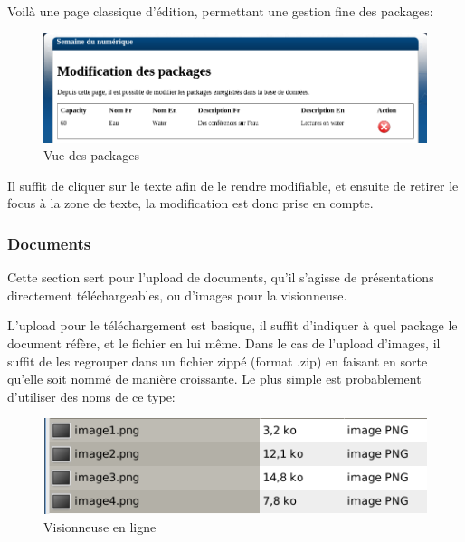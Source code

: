 Voilà une page classique d'édition, permettant une gestion fine des packages:

    \begin{figure}[h]
        \begin{center}
        \includegraphics[scale=0.4]{images/screenshotPackages.png} 
        \end{center}
        \caption{Vue des packages}
        \label{Vue des packages}
    \end{figure}

Il suffit de cliquer sur le texte afin de le rendre modifiable, et ensuite de retirer
le focus à la zone de texte, la modification est donc prise en compte.

            \subsubsection{Documents}

Cette section sert pour l'upload de documents, qu'il s'agisse de présentations directement téléchargeables, ou d'images pour la visionneuse.

L'upload pour le téléchargement est basique, il suffit d'indiquer à quel package le document réfère, et le fichier en lui même.
Dans le cas de l'upload d'images, il suffit de les regrouper dans un fichier zippé (format .zip) en faisant en sorte qu'elle soit
nommé de manière croissante. Le plus simple est probablement d'utiliser des noms de ce type:

    \begin{figure}[h]
        \begin{center}
        \includegraphics[scale=0.4]{images/screenshotImages.png} 
        \end{center}
        \caption{Visionneuse en ligne}
        \label{Visionneuse en ligne}
    \end{figure}

